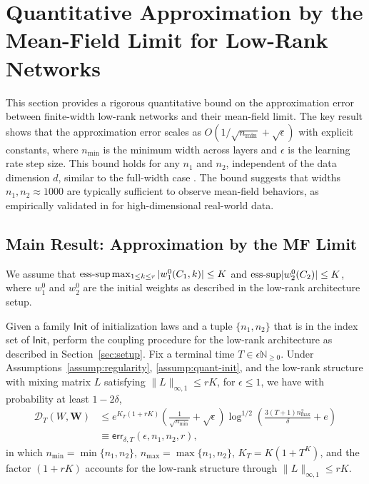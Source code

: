 \section{Quantitative Approximation by the Mean-Field Limit for Low-Rank Networks}
\label{sec:quantitative}

This section provides a rigorous quantitative bound on the approximation error between finite-width low-rank networks and their mean-field limit. The key result shows that the approximation error scales as $O(1/\sqrt{n_{\min}} + \sqrt{\epsilon})$ with explicit constants, where $n_{\min}$ is the minimum width across layers and $\epsilon$ is the learning rate step size. This bound holds for any $n_1$ and $n_2$, independent of the data dimension $d$, similar to the full-width case \cite{nguyen2020global,araujo2019mean}. The bound suggests that widths $n_1, n_2 \approx 1000$ are typically sufficient to observe mean-field behaviors, as empirically validated in \cite{nguyen2019meanfield} for high-dimensional real-world data.

\subsection{Main Result: Approximation by the MF Limit}

\begin{assumption}
\label{assump:quant-init}
We assume that ${\rm ess\text{-}sup}\max_{1\le k\le r}|w_1^0(C_1,k)| \le K$ and ${\rm ess\text{-}sup}|w_2^0(C_2)| \le K$, where $w_1^0$ and $w_2^0$ are the initial weights as described in the low-rank architecture setup.
\end{assumption}

\begin{theorem}
\label{thm:quantitative-lowrank}
Given a family $\mathsf{Init}$ of initialization laws and a tuple $\{n_1, n_2\}$ that is in the index set of $\mathsf{Init}$, perform the coupling procedure for the low-rank architecture as described in Section~\ref{sec:setup}. Fix a terminal time $T \in \epsilon\mathbb{N}_{\ge 0}$. Under Assumptions~\ref{assump:regularity}, \ref{assump:quant-init}, and the low-rank structure with mixing matrix $L$ satisfying $\|L\|_{\infty,1} \le rK$, for $\epsilon \le 1$, we have with probability at least $1-2\delta$,
\begin{align*}
\mathscr{D}_T(W, \mathbf{W}) &\le e^{K_T(1+rK)}\left(\frac{1}{\sqrt{n_{\min}}} + \sqrt{\epsilon}\right)\log^{1/2}\left(\frac{3(T+1)n_{\max}^2}{\delta} + e\right) \\
&\equiv \mathsf{err}_{\delta,T}(\epsilon, n_1, n_2, r),
\end{align*}
in which $n_{\min} = \min\{n_1, n_2\}$, $n_{\max} = \max\{n_1, n_2\}$, $K_T = K(1+T^K)$, and the factor $(1+rK)$ accounts for the low-rank structure through $\|L\|_{\infty,1} \le rK$.
\end{theorem}

